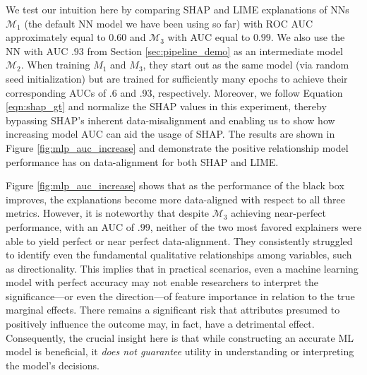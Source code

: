 \documentclass[mnsc,blindrev]{informs3}
\begin{document}
            
            We test our intuition here by comparing SHAP and LIME explanations of NNs $\mathcal{M}_1$ (the default NN model we have been using so far) with ROC AUC approximately equal to $0.60$ and $\mathcal{M}_3$ with AUC equal to $0.99$. We also use the NN with AUC $.93$ from Section \ref{sec:pipeline_demo} as an intermediate model $\mathcal{M}_2$. When training $M_1$ and $M_3$, they start out as the same model (via random seed initialization) but are trained for sufficiently many epochs to achieve their corresponding AUCs of .6 and .93, respectively. Moreover, we follow Equation \ref{eqn:shap_gt} and normalize the SHAP values in this experiment, thereby bypassing SHAP's inherent data-misalignment and enabling us to show how increasing model AUC can aid the usage of SHAP. The results are shown in Figure \ref{fig:mlp_auc_increase} and demonstrate the positive relationship model performance has on data-alignment for both SHAP and LIME.
            
     Figure \ref{fig:mlp_auc_increase} shows that as the performance of the black box improves, the explanations become more data-aligned with respect to all three metrics. However, it is noteworthy that despite $\mathcal{M}_3$ achieving near-perfect performance, with an AUC of $.99$, neither of the two most favored explainers were able to yield perfect or near perfect data-alignment. They consistently struggled to identify even the fundamental qualitative relationships among variables, such as directionality. This implies that in practical scenarios, even a machine learning model with perfect accuracy may not enable researchers to interpret the significance—or even the direction—of feature importance in relation to the true marginal effects. There remains a significant risk that attributes presumed to positively influence the outcome may, in fact, have a detrimental effect. Consequently, the crucial insight here is that while constructing an accurate ML model is beneficial, it \emph{does not guarantee} utility in understanding or interpreting the model's decisions. 
\end{document}
